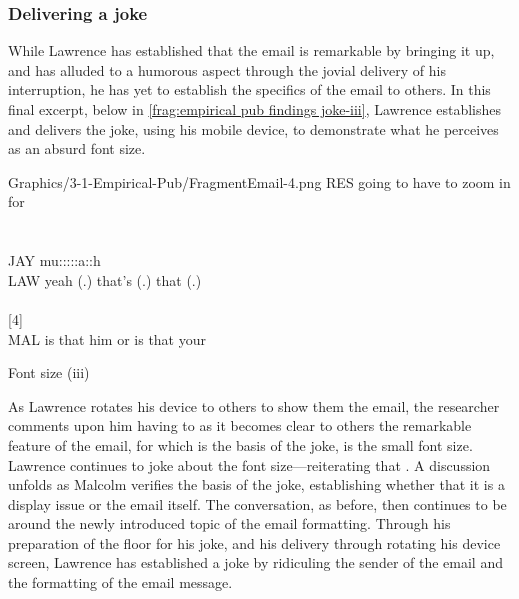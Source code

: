 \subsubsection{Delivering a joke}\label{sec:empirical pub findings joke delivery}
\begin{revisedsubmission}
While Lawrence has established that the email is remarkable by bringing it up, and has alluded to a humorous aspect through the jovial delivery of his interruption, he has yet to establish the specifics of the email to others.
In this final excerpt, below in \autoref{frag:empirical pub findings joke-iii}, Lawrence establishes and delivers the joke, using his mobile device, to demonstrate what he perceives as an absurd font size.

\begin{inlinefrag*}
    {
    \begin{transcript*}[16]
           {Graphics/3-1-Empirical-Pub/FragmentEmail-4.png}
        \by RES {going to have to zoom in for} \\
         \\
         \\
        \by JAY {mu:::::a::h} \\
        \by LAW {yeah (.) that's (.) that (.)} \\
         \\
        \later  {\ldots}[4] \\
        \by MAL {is that him or is that your} \\
    \end{transcript*}
    \caption{Font size (iii)}\label{frag:empirical pub findings joke-iii}
    }
\end{inlinefrag*}

As Lawrence rotates his device to others to show them the email, the researcher comments upon him having to  as it becomes clear to others the remarkable feature of the email, for which is the basis of the joke, is the small font size.
Lawrence continues to joke about the font size---reiterating that . 
A discussion unfolds as Malcolm verifies the basis of the joke, establishing whether that it is a display issue or the email itself.
The conversation, as before, then continues to be around the newly introduced topic of the email formatting.
Through his preparation of the floor for his joke, and his delivery through rotating his device screen, Lawrence has established a joke by ridiculing the sender of the email and the formatting of the email message.


\end{revisedsubmission}
